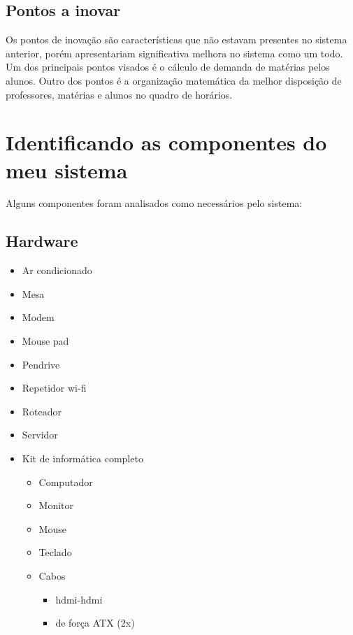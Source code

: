         \subsection{Pontos a inovar}
            Os pontos de inovação são características que não estavam presentes no sistema anterior, porém apresentariam significativa melhora no sistema como um todo. Um dos principais pontos visados é o cálculo de demanda de matérias pelos alunos. Outro dos pontos é a organização matemática da melhor disposição de professores, matérias e alunos no quadro de horários.

    \section{Identificando as componentes do meu sistema}
        Alguns componentes foram analisados como necessários pelo sistema:
        \subsection{Hardware}
            \begin{itemize}
                \item Ar condicionado
                \item Mesa
                \item Modem
                \item Mouse pad
                \item Pendrive
                \item Repetidor wi-fi
                \item Roteador
                \item Servidor
                \item Kit de informática completo
                \begin{itemize}
                    \item Computador
                    \item Monitor
                    \item Mouse
                    \item Teclado
                    \item Cabos
                    \begin{itemize}
                        \item hdmi-hdmi
                        \item de força ATX (2x)
                    \end{itemize}
                \end{itemize}
         	\end{itemize}
    
